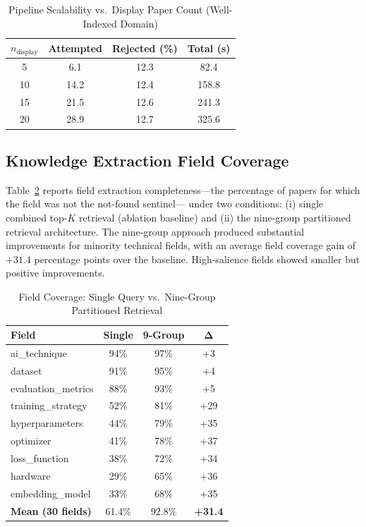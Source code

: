 \documentclass[conference]{IEEEtran}
\begin{document}
\begin{table}[htbp]
\caption{Pipeline Scalability vs.\ Display Paper Count (Well-Indexed Domain)}
\label{tab:scalability}
\begin{center}
\begin{tabular}{|c|c|c|c|}
\hline
$n_{\text{display}}$ & \textbf{Attempted} & \textbf{Rejected (\%)} & \textbf{Total (s)} \\
\hline
5  & 6.1  & 12.3 & 82.4 \\
10 & 14.2 & 12.4 & 158.8 \\
15 & 21.5 & 12.6 & 241.3 \\
20 & 28.9 & 12.7 & 325.6 \\
\hline
\end{tabular}
\end{center}
\end{table}

\subsection{Knowledge Extraction Field Coverage}

Table~\ref{tab:coverage} reports field extraction completeness---the
percentage of papers for which the field was not the not-found sentinel---
under two conditions: (i) single combined top-$K$ retrieval (ablation
baseline) and (ii) the nine-group partitioned retrieval architecture. The
nine-group approach produced substantial improvements for minority technical
fields, with an average field coverage gain of $+31.4$ percentage points
over the baseline. High-salience fields showed smaller but positive
improvements.

\begin{table}[htbp]
\caption{Field Coverage: Single Query vs.\ Nine-Group Partitioned Retrieval}
\label{tab:coverage}
\begin{center}
\begin{tabular}{|l|c|c|c|}
\hline
\textbf{Field} & \textbf{Single} & \textbf{9-Group} & $\boldsymbol{\Delta}$ \\
\hline
ai\_technique      & 94\% & 97\% & +3  \\
dataset            & 91\% & 95\% & +4  \\
evaluation\_metrics& 88\% & 93\% & +5  \\
training\_strategy & 52\% & 81\% & +29 \\
hyperparameters    & 44\% & 79\% & +35 \\
optimizer          & 41\% & 78\% & +37 \\
loss\_function     & 38\% & 72\% & +34 \\
hardware           & 29\% & 65\% & +36 \\
embedding\_model   & 33\% & 68\% & +35 \\
\textbf{Mean (30 fields)} & 61.4\% & 92.8\% & \textbf{+31.4} \\
\hline
\end{tabular}
\end{center}
\end{table}
\end{document}
